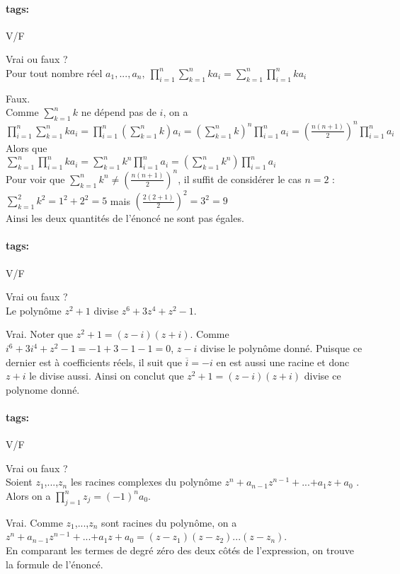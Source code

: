 \documentclass[12pt]{article}
\newcommand*{\xfield}[1]{\begin{mdframed}\centering #1\end{mdframed}\bigskip}
\newenvironment{note}{}{}
\newcommand*{\tags}[1]{\paragraph{tags: }#1}
\begin{document}
\begin{note}
\tags{V/F}
	\xfield{Vrai ou faux ?\\
	Pour tout nombre réel $a_1,...,a_n,\ \prod\limits^n_{i=1}\sum\limits^n_{k=1}ka_i = \sum\limits^n_{k=1}\prod\limits^n_{i=1}ka_i$ }
	\xfield{Faux.\\
	Comme $\sum\limits^{n}_{k=1}k$ ne dépend pas de $i$, on a \\
	$\prod\limits^n_{i=1}\sum\limits^n_{k=1}ka_i = \prod\limits^n_{i=1} \left(\sum\limits^n_{k=1}k\right) a_i = (\sum\limits^n_{k=1}k)^n\prod\limits^n_{i=1}a_i = \left(\frac{n(n+1)}{2}\right)^n \prod\limits^n_{i=1}a_i$\\
	Alors que\\
	$\sum\limits^n_{k=1}\prod\limits^n_{i=1}ka_i = \sum\limits^n_{k=1}k^n\prod\limits^n_{i=1}a_i = \left(\sum\limits^n_{k=1}k^n\right) \prod\limits^n_{i=1}a_i$\\
	Pour voir que $\sum\limits^n_{k=1}k^n \neq \left( \frac{n(n+1)}{2}\right)^n$, il suffit de considérer le cas $n=2$ :\\
	$\sum\limits^2_{k=1}k^2 = 1^2+2^2=5$ mais $\left( \frac{2(2+1)}{2}\right)^2=3^2=9$\\
	Ainsi les deux quantités de l'énoncé ne sont pas égales.}
\end{note}

\begin{note}
\tags{V/F}
	\xfield{Vrai ou faux ?\\
	Le polynôme $z^2 + 1$ divise $z^6 + 3z^4 + z^2 - 1$.}
	\xfield{Vrai. Noter que $z^2 +1 = (z-i)(z+i)$. Comme$i^6 + 3i^4 + z^2 - 1=-1+3-1-1=0$, $z-i$ divise le polynôme donné. Puisque ce dernier est à coefficients réels, il suit que $\overline{i} = -i$ en est aussi une racine et donc $z+i$ le divise aussi. Ainsi on conclut que $z^2+1 = (z-i)(z+i)$ divise ce polynome donné.}
\end{note}

\begin{note}
\tags{V/F}
	\xfield{Vrai ou faux ?\\
	Soient $z_1$,...,$z_n$ les racines complexes du polynôme $z^n + a_{n-1}z^{n-1} +$...$+ a_1z + a_0$ .\\
	Alors on a $\prod\limits^n_{j=1} z_j = (-1)^n a_0$.}
	\xfield{Vrai. Comme $z_1$,...,$z_n$ sont racines du polynôme, on a\\
	$z^n + a_{n-1}z^{n-1} +$...$+ a_1z + a_0 = (z-z_1)(z-z_2)...(z-z_n)$.\\
	En comparant les termes de degré zéro des deux côtés de l'expression, on trouve la formule de l'énoncé.}
\end{note}
\end{document}
